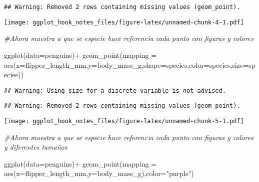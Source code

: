 \documentclass[
]{article}
\newenvironment{Shaded}{\begin{snugshade}}{\end{snugshade}}
\newcommand{\AttributeTok}[1]{\textcolor[rgb]{0.77,0.63,0.00}{#1}}
\newcommand{\CommentTok}[1]{\textcolor[rgb]{0.56,0.35,0.01}{\textit{#1}}}
\newcommand{\FunctionTok}[1]{\textcolor[rgb]{0.00,0.00,0.00}{#1}}
\newcommand{\NormalTok}[1]{#1}
\newcommand{\SpecialCharTok}[1]{\textcolor[rgb]{0.00,0.00,0.00}{#1}}
\newcommand{\StringTok}[1]{\textcolor[rgb]{0.31,0.60,0.02}{#1}}
\begin{document}
\begin{verbatim}
## Warning: Removed 2 rows containing missing values (geom_point).
\end{verbatim}

\texttt{[image: ggplot\_hook\_notes\_files/figure-latex/unnamed-chunk-4-1.pdf]}

\begin{Shaded}
\begin{Highlighting}[]
\CommentTok{\#Ahora muestra a que se especie hace referencia cada punto con figuras y colores}
\end{Highlighting}
\end{Shaded}

\begin{Shaded}
\begin{Highlighting}[]
\FunctionTok{ggplot}\NormalTok{(}\AttributeTok{data=}\NormalTok{penguins)}\SpecialCharTok{+}
  \FunctionTok{geom\_point}\NormalTok{(}\AttributeTok{mapping =} \FunctionTok{aes}\NormalTok{(}\AttributeTok{x=}\NormalTok{flipper\_length\_mm,}\AttributeTok{y=}\NormalTok{body\_mass\_g,}\AttributeTok{shape=}\NormalTok{species,}\AttributeTok{color=}\NormalTok{species,}\AttributeTok{size=}\NormalTok{species))}
\end{Highlighting}
\end{Shaded}

\begin{verbatim}
## Warning: Using size for a discrete variable is not advised.
\end{verbatim}

\begin{verbatim}
## Warning: Removed 2 rows containing missing values (geom_point).
\end{verbatim}

\texttt{[image: ggplot\_hook\_notes\_files/figure-latex/unnamed-chunk-5-1.pdf]}

\begin{Shaded}
\begin{Highlighting}[]
\CommentTok{\#Ahora muestra a que se especie hace referencia cada punto con figuras y colores y diferentes tamaños}
\end{Highlighting}
\end{Shaded}

\begin{Shaded}
\begin{Highlighting}[]
\FunctionTok{ggplot}\NormalTok{(}\AttributeTok{data=}\NormalTok{penguins)}\SpecialCharTok{+}
  \FunctionTok{geom\_point}\NormalTok{(}\AttributeTok{mapping =} \FunctionTok{aes}\NormalTok{(}\AttributeTok{x=}\NormalTok{flipper\_length\_mm,}\AttributeTok{y=}\NormalTok{body\_mass\_g),}\AttributeTok{color=}\StringTok{"purple"}\NormalTok{)}
\end{Highlighting}
\end{Shaded}
\end{document}
